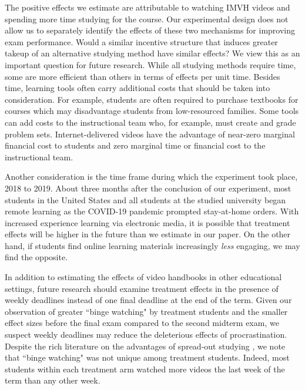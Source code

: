 \documentclass[12pt]{article}
\begin{document}
The positive effects we estimate are attributable to watching IMVH videos and spending more time studying for the course. Our experimental design does not allow us to separately identify the effects of these two mechanisms for improving exam performance. Would a similar incentive structure that induces greater takeup of an alternative studying method have similar effects? We view this as an important question for future research. While all studying methods require time, some are more efficient than others in terms of effects per unit time. Besides time, learning tools often carry additional costs that should be taken into consideration. For example, students are often required to purchase textbooks for courses which may disadvantage students from low-resourced families. Some tools can add costs to the instructional team who, for example, must create and grade problem sets. Internet-delivered videos have the advantage of near-zero marginal financial cost to students and zero marginal time or financial cost to the instructional team.

Another consideration is the time frame during which the experiment took place, 2018 to 2019. About three months after the conclusion of our experiment, most students in the United States and all students at the studied university began remote learning as the COVID-19 pandemic prompted stay-at-home orders. With increased experience learning via electronic media, it is possible that treatment effects will be higher in the future than we estimate in our paper. On the other hand, if students find online learning materials increasingly \textit{less} engaging, we may find the opposite.

In addition to estimating the effects of video handbooks in other educational settings, future research should examine treatment effects in the presence of weekly deadlines instead of one final deadline at the end of the term. Given our observation of greater ``binge watching" by treatment students and the smaller effect sizes before the final exam compared to the second midterm exam, we suspect weekly deadlines may reduce the deleterious effects of procrastination. Despite the rich literature on the advantages of spread-out studying \parencite{kornell2009, cpvw2006}, we note that ``binge watching" was not unique among treatment students. Indeed, most students within each treatment arm watched more videos the last week of the term than any other week.

\end{document}
